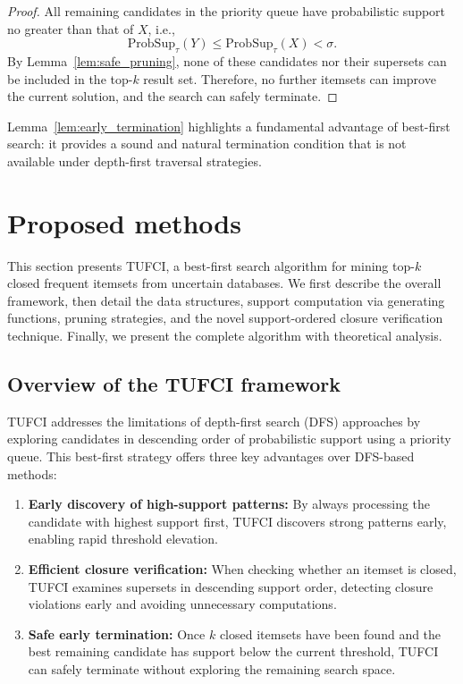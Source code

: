 \documentclass[10pt,letterpaper]{article}
\begin{document}
\begin{proof}
All remaining candidates in the priority queue have probabilistic support no greater than that of $X$, i.e.,
\[
\mathrm{ProbSup}_{\tau}(Y) \le \mathrm{ProbSup}_{\tau}(X) < \sigma.
\]
By Lemma~\ref{lem:safe_pruning}, none of these candidates nor their supersets can be included in the top-$k$ result set. Therefore, no further itemsets can improve the current solution, and the search can safely terminate.
\end{proof}

Lemma~\ref{lem:early_termination} highlights a fundamental advantage of best-first search: it provides a sound and natural termination condition that is not available under depth-first traversal strategies.

\section*{Proposed methods}

This section presents TUFCI, a best-first search algorithm for mining top-$k$ closed frequent itemsets from uncertain databases. We first describe the overall framework, then detail the data structures, support computation via generating functions, pruning strategies, and the novel support-ordered closure verification technique. Finally, we present the complete algorithm with theoretical analysis.

\subsection*{Overview of the TUFCI framework}

TUFCI addresses the limitations of depth-first search (DFS) approaches by exploring candidates in descending order of probabilistic support using a priority queue. This best-first strategy offers three key advantages over DFS-based methods:

\begin{enumerate}
    \item \textbf{Early discovery of high-support patterns:} By always processing the candidate with highest support first, TUFCI discovers strong patterns early, enabling rapid threshold elevation.
    
    \item \textbf{Efficient closure verification:} When checking whether an itemset is closed, TUFCI examines supersets in descending support order, detecting closure violations early and avoiding unnecessary computations.
    
    \item \textbf{Safe early termination:} Once $k$ closed itemsets have been found and the best remaining candidate has support below the current threshold, TUFCI can safely terminate without exploring the remaining search space.
\end{enumerate}
\end{document}
